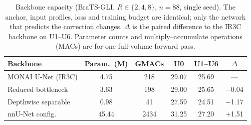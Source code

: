 \begin{table}[pos=t]
\caption{Backbone capacity (BraTS-GLI, $R\in\{2,4,8\}$, $n=88$, single seed). The anchor, input profiles, loss and training budget are identical; only the network that predicts the correction changes. $\Delta$ is the paired difference to the IR3C backbone on U1--U6. Parameter counts and multiply--accumulate operations (MACs) are for one full-volume forward pass.}
\label{tab:backbone}
\footnotesize\setlength{\tabcolsep}{3pt}
\begin{tabular*}{\columnwidth}{@{\extracolsep{\fill}}lccccc@{}}
\toprule
Backbone & Param.\ (M) & GMACs & U0 & U1--U6 & $\Delta$ \\
\midrule
MONAI U-Net (IR3C) & 4.75 & 218 & 29.07 & 25.69 & --- \\
Reduced bottleneck & 3.63 & 198 & 29.00 & 25.65 & $-$0.04 \\
Depthwise separable & 0.98 & 41 & 27.59 & 24.51 & $-$1.17 \\
nnU-Net config. & 45.44 & 2434 & 31.25 & 27.20 & $+$1.51 \\
\bottomrule
\end{tabular*}
\end{table}
